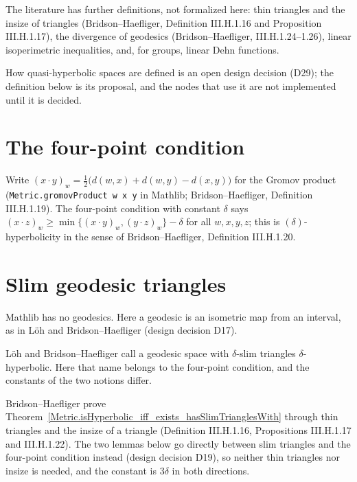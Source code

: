 The literature has further definitions, not formalized here: thin triangles and the insize of
triangles (Bridson--Haefliger, Definition III.H.1.16 and Proposition III.H.1.17), the divergence of
geodesics (Bridson--Haefliger, III.H.1.24--1.26), linear isoperimetric inequalities, and, for
groups, linear Dehn functions.

How quasi-hyperbolic spaces are defined is an open design decision (D29); the definition below is
its proposal, and the nodes that use it are not implemented until it is decided.

\section*{The four-point condition}

Write $(x \cdot y)_w = \frac12\bigl(d(w, x) + d(w, y) - d(x, y)\bigr)$ for the Gromov product
(\texttt{Metric.gromovProduct w x y} in Mathlib; Bridson--Haefliger, Definition III.H.1.19). The
four-point condition with constant $\delta$ says
$(x \cdot z)_w \ge \min\{(x \cdot y)_w, (y \cdot z)_w\} - \delta$ for all $w, x, y, z$; this is
$(\delta)$-hyperbolicity in the sense of Bridson--Haefliger, Definition III.H.1.20.


\section*{Slim geodesic triangles}

Mathlib has no geodesics. Here a geodesic is an isometric map from an interval, as in L\"oh and
Bridson--Haefliger (design decision D17).



L\"oh and Bridson--Haefliger call a geodesic space with $\delta$-slim triangles
$\delta$-hyperbolic. Here that name belongs to the four-point condition, and the constants of
the two notions differ.

Bridson--Haefliger prove Theorem~\ref{Metric.isHyperbolic_iff_exists_hasSlimTrianglesWith} through
thin triangles and the
insize of a triangle (Definition III.H.1.16, Propositions III.H.1.17 and III.H.1.22). The two
lemmas below go directly between slim triangles and the four-point condition instead
(design decision D19), so neither thin triangles nor insize is needed, and the constant is
$3\delta$ in both directions.

